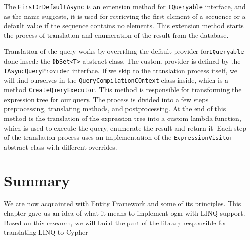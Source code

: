 The \texttt{FirstOrDefaultAsync} is an extension method for \texttt{IQueryable} interface, and as the name suggests, it is used for retrieving the first element of a sequence or a default value if the sequence contains no elements.
This extension method starts the process of translation and enumeration of the result from the database.

Translation of the query works by overriding the default provider for\linebreak\texttt{IQueryable} done insede the \texttt{DbSet<T>} abstract class. The custom provider is defined by the \texttt{IAsyncQueryProvider} interface.
If we skip to the translation process itself, we will find ourselves in the \texttt{QueryCompilationCOntext} class inside, which is a method \texttt{CreateQueryExecutor}.
This method is responsible for transforming the expression tree for our query. The process is divided into a few steps preprocessing, translating methods, and postprocessing.
At the end of this method is the translation of the expression tree into a custom lambda function, which is used to execute the query, enumerate the result and return it.
Each step of the translation process uses an implementation of the \texttt{ExpressionVisitor} abstract class with different overrides.


\section {Summary}

We are now acquainted with Entity Framework and some of its principles. This chapter gave us an idea of what it means to implement
\acrshort{ogm} with LINQ support. Based on this research, we will build the part of the library responsible for translating LINQ to Cypher.